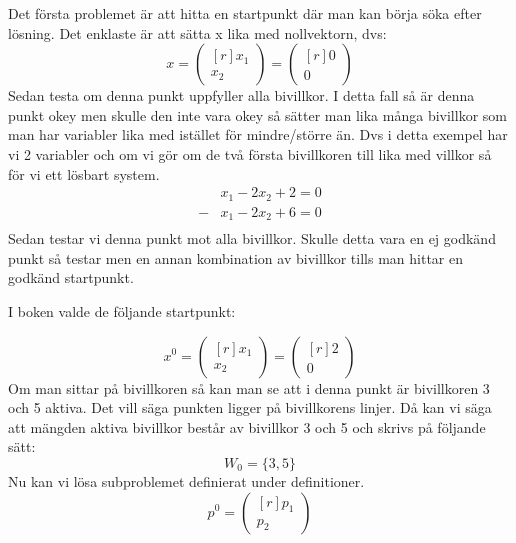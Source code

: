 Det första problemet är att hitta en startpunkt där man kan börja söka efter lösning. Det enklaste är att sätta x lika med nollvektorn, dvs:
  \[
 x=
\begin{pmatrix*}[r]
   x_1  \\
   x_2 
\end{pmatrix*}
=
\begin{pmatrix*}[r]
   0  \\
   0 
\end{pmatrix*}
\]
Sedan testa om denna punkt uppfyller alla bivillkor. I detta fall så är denna punkt okey men skulle den inte vara okey så sätter man lika många bivillkor som man har variabler lika med istället för mindre/större än. Dvs i detta exempel har vi 2 variabler och om vi gör om de två första bivillkoren till lika med villkor så för vi ett lösbart system. 
\begin{equation*}
\begin{aligned}
 & x_1-2x_2+2 =0  \\
 -& x_1-2x_2+6 =0  \\
\end{aligned}
\end{equation*}
Sedan testar vi denna punkt mot alla bivillkor. Skulle detta vara en ej godkänd punkt så testar men en annan kombination av bivillkor tills man hittar en godkänd startpunkt. 

I boken valde de följande startpunkt:

  \[
 x^0=
\begin{pmatrix*}[r]
   x_1  \\
   x_2 
\end{pmatrix*}
=
\begin{pmatrix*}[r]
   2  \\
   0 
\end{pmatrix*}
\]
Om man sittar på bivillkoren så kan man se att i denna punkt är bivillkoren 3 och 5 aktiva. Det vill säga punkten ligger på bivillkorens linjer. Då kan vi säga att mängden aktiva bivillkor består av bivillkor 3 och 5 och skrivs på följande sätt:
\begin{equation*}
W_0=\{ 3,5 \}
\end{equation*}
Nu kan vi lösa subproblemet definierat under definitioner.
  \[
 p^0=
\begin{pmatrix*}[r]
   p_1  \\
   p_2 
\end{pmatrix*}
\]

